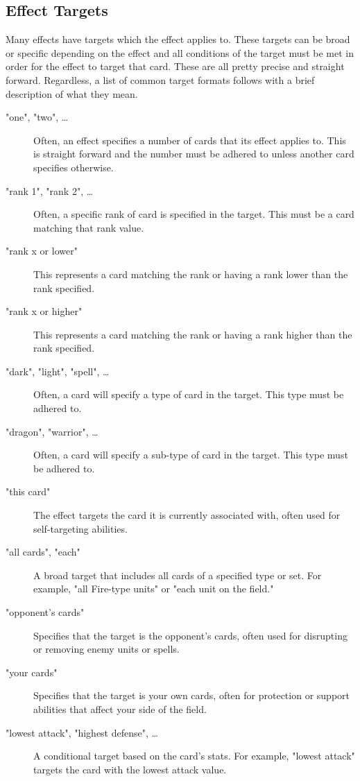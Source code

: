 \subsection{Effect Targets}
Many effects have targets which the effect applies to. These targets can be broad or specific depending on the effect and all conditions of the target must be met in order for the effect to target that card. These are all pretty precise and straight forward. Regardless, a list of common target formats follows with a brief description of what they mean.
\begin{description}
	\item["one", "two", \dots] Often, an effect specifies a number of cards that its effect applies to. This is straight forward and the number must be adhered to unless another card specifies otherwise.
	\item["rank 1", "rank 2", \dots] Often, a specific rank of card is specified in the target. This must be a card matching that rank value.
	\item["rank x or lower"] This represents a card matching the rank or having a rank lower than the rank specified. 
	\item["rank x or higher"]  This represents a card matching the rank or having a rank higher than the rank specified. 
	\item["dark", "light", "spell", \dots] Often, a card will specify a type of card in the target. This type must be adhered to.
	\item["dragon", "warrior", \dots] Often, a card will specify a sub-type of card in the target. This type must be adhered to.
	\item["this card"] The effect targets the card it is currently associated with, often used for self-targeting abilities.
	\item["all cards", "each"] A broad target that includes all cards of a specified type or set. For example, "all Fire-type units" or "each unit on the field."
	\item["opponent's cards"] Specifies that the target is the opponent's cards, often used for disrupting or removing enemy units or spells.
	\item["your cards"] Specifies that the target is your own cards, often for protection or support abilities that affect your side of the field.
	\item["lowest attack", "highest defense", \dots] A conditional target based on the card’s stats. For example, "lowest attack" targets the card with the lowest attack value.

\end{description}
